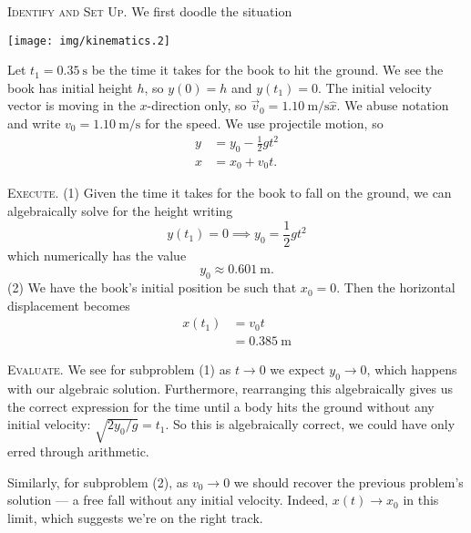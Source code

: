 \begin{soln}
\textsc{Identify and Set Up.}
We first doodle the situation
\begin{center}
\texttt{[image: img/kinematics.2]}
\end{center}
Let $t_{1}=\SI{0.35}{\second}$ be the time it takes for the book to hit
the ground. We see the book has initial height $h$, so $y(0)=h$ and
$y(t_{1})=0$. The initial velocity vector is moving in the $x$-direction
only, so $\vec{v}_{0}=\SI{1.10}{\meter\per\second}\hat{x}$. We abuse
notation and write $v_{0}=\SI{1.10}{\meter\per\second}$ for the speed. We use
projectile motion, so
\begin{equation*}
\begin{split}
y &= y_{0} - \frac{1}{2}gt^{2}\\
x &= x_{0} + v_{0}t.
\end{split}
\end{equation*}

\textsc{Execute.} (1) Given the time it takes for the book to fall on the
ground, we can algebraically solve for the height writing
\begin{equation}
y(t_{1})=0\implies y_{0}=\frac{1}{2}gt^{2}
\end{equation}
which numerically has the value
\begin{equation}
y_{0}\approx \SI{0.601}{\meter}.
\end{equation}
(2) We have the book's initial position be such that $x_{0}=0$. Then the
horizontal displacement becomes
\begin{equation}
\begin{split}
x(t_{1}) &= v_{0}t\\
&= \SI{0.385}{\meter}
\end{split}
\end{equation}

\textsc{Evaluate.}
We see for subproblem (1) as $t\to0$ we expect $y_{0}\to0$, which
happens with our algebraic solution. Furthermore, rearranging this
algebraically gives us the correct expression for the time until a body
hits the ground without any initial velocity:
$\sqrt{2y_{0}/g}=t_{1}$. So this is algebraically correct, we could have
only erred through arithmetic.

Similarly, for subproblem (2), as $v_{0}\to0$ we should recover the
previous problem's solution --- a free fall without any initial
velocity. Indeed, $x(t)\to x_0$ in this limit, which suggests we're on
the right track.
\end{soln}

